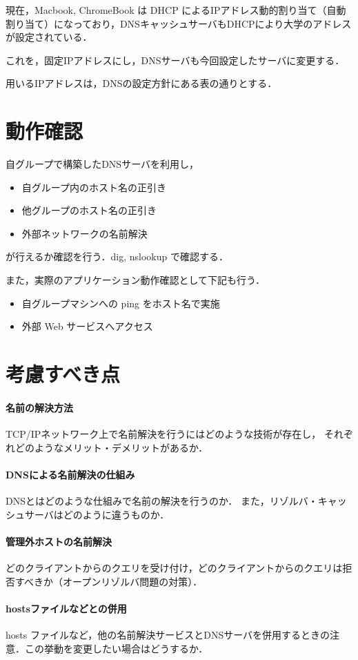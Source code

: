 現在，Macbook, ChromeBook は DHCP によるIPアドレス動的割り当て（自動割り当て）になっており，DNSキャッシュサーバもDHCPにより大学のアドレスが設定されている．

これを，固定IPアドレスにし，DNSサーバも今回設定したサーバに変更する．

用いるIPアドレスは，DNSの設定方針にある表の通りとする．


\section{動作確認}
 自グループで構築したDNSサーバを利用し，
 \begin{itemize}
     \item 自グループ内のホスト名の正引き
     \item 他グループのホスト名の正引き
     \item 外部ネットワークの名前解決
 \end{itemize}
 が行えるか確認を行う．dig, nslookup で確認する．

また，実際のアプリケーション動作確認として下記も行う．
 \begin{itemize}
     \item 自グループマシンへの ping をホスト名で実施
     \item 外部 Web サービスへアクセス
 \end{itemize}

 
\section{考慮すべき点}
\paragraph{名前の解決方法}
			TCP/IPネットワーク上で名前解決を行うにはどのような技術が存在し，
			それぞれどのようなメリット・デメリットがあるか．
\paragraph{DNSによる名前解決の仕組み}
		DNSとはどのような仕組みで名前の解決を行うのか．
		また，リゾルバ・キャッシュサーバはどのように違うものか．
\paragraph{管理外ホストの名前解決}
どのクライアントからのクエリを受け付け，どのクライアントからのクエリは拒否すべきか（オープンリゾルバ問題の対策）．
\paragraph{hostsファイルなどとの併用}
	hosts ファイルなど，他の名前解決サービスとDNSサーバを併用するときの注意．この挙動を変更したい場合はどうするか．
 
